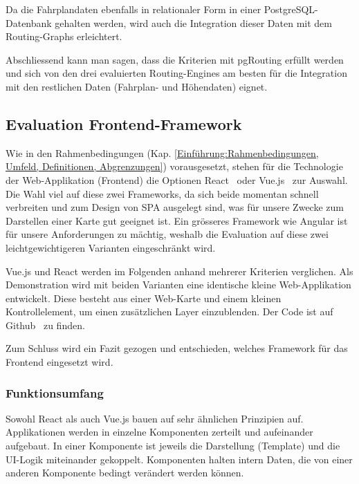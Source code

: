 Da die Fahrplandaten ebenfalls in relationaler Form in einer PostgreSQL-Datenbank gehalten werden, wird auch die Integration dieser Daten mit dem \glspl{Routing-Graph} erleichtert.

Abschliessend kann man sagen, dass die Kriterien mit pgRouting erfüllt werden und sich von den drei evaluierten \glspl{Routing-Engine} am besten für die Integration mit den restlichen Daten (Fahrplan- und Höhendaten) eignet.

\subsection{Evaluation Frontend-Framework}
\label{Analyse:Evaluation Frontend-Framework}

Wie in den Rahmenbedingungen (Kap. \ref{Einführung:Rahmenbedingungen, Umfeld, Definitionen, Abgrenzungen}) vorausgesetzt, stehen für die Technologie der Web-Applikation (Frontend) die Optionen React~\cite{react} oder Vue.js~\cite{vuejs} zur Auswahl.
Die Wahl viel auf diese zwei Frameworks, da sich beide momentan schnell verbreiten und zum Design von \ac{SPA} ausgelegt sind, was für unsere Zwecke zum Darstellen einer Karte gut geeignet ist.
Ein grösseres Framework wie Angular ist für unsere Anforderungen zu mächtig, weshalb die Evaluation auf diese zwei leichtgewichtigeren Varianten eingeschränkt wird.

Vue.js und React werden im Folgenden anhand mehrerer Kriterien verglichen.
Als Demonstration wird mit beiden Varianten eine identische kleine Web-Applikation entwickelt.
Diese besteht aus einer Web-Karte und einem kleinen Kontrollelement, um einen zusätzlichen Layer einzublenden.
Der Code ist auf Github~\cite{github:playground} zu finden.

Zum Schluss wird ein Fazit gezogen und entschieden, welches Framework für das Frontend eingesetzt wird.

\subsubsection{Funktionsumfang}
\label{Analyse Framework:Funktionsumfang}

Sowohl React als auch Vue.js bauen auf sehr ähnlichen Prinzipien auf.
Applikationen werden in einzelne Komponenten zerteilt und aufeinander aufgebaut.
In einer Komponente ist jeweils die Darstellung (Template) und die UI-Logik miteinander gekoppelt.
Komponenten halten intern Daten, die von einer anderen Komponente bedingt verändert werden können.


